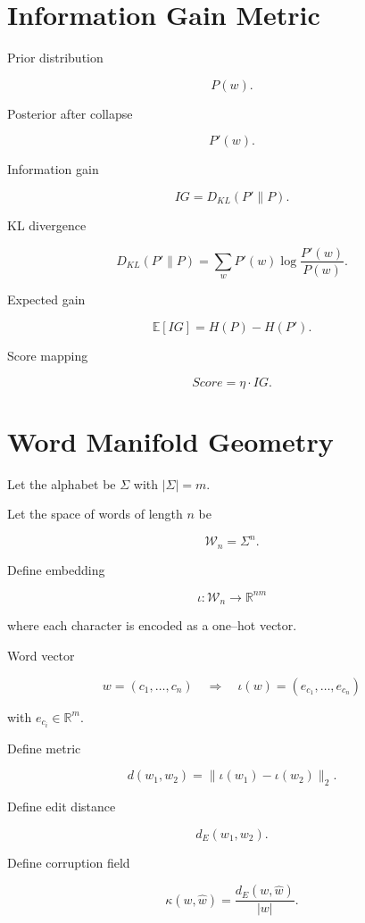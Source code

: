\documentclass[11pt]{article}
\begin{document}
\section{Information Gain Metric}

Prior distribution

\[
P(w).
\]

Posterior after collapse

\[
P'(w).
\]

Information gain

\[
IG =
D_{KL}(P' \| P).
\]

KL divergence

\[
D_{KL}(P' \| P)
=
\sum_w
P'(w)
\log
\frac{P'(w)}{P(w)}.
\]

Expected gain

\[
\mathbb{E}[IG]
=
H(P) - H(P').
\]

Score mapping

\[
Score = \eta \cdot IG.
\]


\section{Word Manifold Geometry}

Let the alphabet be $\Sigma$ with $|\Sigma| = m$.

Let the space of words of length $n$ be

\[
\mathcal{W}_n = \Sigma^n.
\]

Define embedding

\[
\iota : \mathcal{W}_n \rightarrow \mathbb{R}^{nm}
\]

where each character is encoded as a one–hot vector.

Word vector

\[
w = (c_1,\dots,c_n)
\quad \Rightarrow \quad
\iota(w) =
(e_{c_1},\dots,e_{c_n})
\]

with $e_{c_i} \in \mathbb{R}^m$.

Define metric

\[
d(w_1,w_2)
=
\|\iota(w_1)-\iota(w_2)\|_2.
\]

Define edit distance

\[
d_E(w_1,w_2).
\]

Define corruption field

\[
\kappa(w,\hat{w})
=
\frac{d_E(w,\hat{w})}{|w|}.
\]
\end{document}
